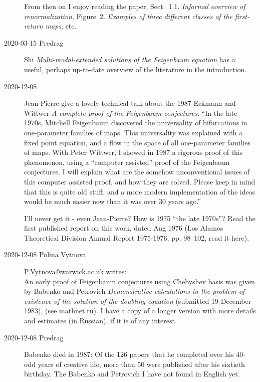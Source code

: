 \begin{description}
From then on I enjoy reading the paper, Sect.~1.1. {\em Informal overview
of renormalization}, Figure~2. \emph{Examples of three different classes
of the first-return maps}, etc.

\item[2020-03-15 Predrag] Shi {\em Multi-modal-extended
solutions of the {Feigenbaum} equation} has a useful, perhaps up-to-date
overview of the literature in the introduction.

\newpage

\item[2020-12-08] Jean-Pierre give a lovely
 {technical talk} about
the 1987 Eckmann and Wittwer
{\em A complete proof of the {Feigenbaum} conjectures}:
``In the late 1970s, Mitchell Feigenbaum discovered the universality of
bifurcations in one-parameter families of maps. This universality was
explained with a fixed point equation, and a flow in the space of all
one-parameter families of maps. With Peter Wittwer, I showed in 1987 a
rigorous proof of this phenomenon, using a ``computer assisted'' proof of
the Feigenbaum conjectures. I will explain what are the somehow
unconventional issues of this computer assisted proof, and how they are
solved. Please keep in mind that this is quite old stuff, and a more
modern implementation of the ideas would be much easier now than it was
over 30 years ago.''

I'll never get it - even Jean-Pierre? How is 1975 ``the late 1970s''?
Read the first published report on this work, dated Aug 1976 (Los Alamos
Theoretical Division Annual Report 1975-1976, pp. 98--102,
 {read it here}).


\item[2020-12-08 Polina Vytnova] P.Vytnova@warwick.ac.uk writes:\\
An early proof of Feigenbaum conjectures using Chebyshev basis was given by
Babenko and Petrovich {\em Demonstrative calculations in the
problem of existence of the solution of the doubling equation}
(submitted 19 December 1983),
{(see mathnet.ru)}.
I have a copy of a longer version with more details and estimates (in
Russian), if it is of any interest.

\item[2020-12-08 Predrag]
{Babenko died in 1987}: Of  the 126  papers  that  he  completed  over
his  40-odd  years  of  creative  life,  more than  50  were  published
after  his  sixtieth  birthday. The Babenko and Petrovich
I have not found in English yet.


\end{description}
